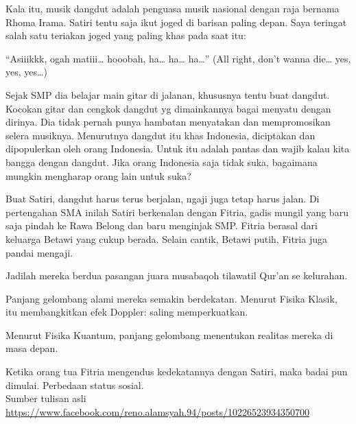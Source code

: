 Kala itu, musik dangdut adalah penguasa musik nasional dengan raja bernama Rhoma Irama. Satiri tentu saja ikut joged di barisan paling depan. Saya teringat salah satu teriakan joged yang paling khas pada saat itu:

“Asiiikkk, ogah matiii… hooobah, ha… ha… ha…” (All right, don’t wanna die… yes, yes, yes…)

Sejak SMP dia belajar main gitar di jalanan, khususnya tentu buat dangdut. Kocokan gitar dan cengkok dangdut yg dimainkannya bagai menyatu dengan dirinya. Dia tidak pernah punya hambatan menyatakan dan mempromosikan selera musiknya. Menurutnya dangdut itu khas Indonesia, diciptakan dan dipopulerkan oleh orang Indonesia. Untuk itu adalah pantas dan wajib kalau kita bangga dengan dangdut. Jika orang Indonesia saja tidak suka, bagaimana mungkin mengharap orang lain untuk suka?

Buat Satiri, dangdut harus terus berjalan, ngaji juga tetap harus jalan. Di pertengahan SMA inilah Satiri berkenalan dengan Fitria, gadis mungil yang baru saja pindah ke Rawa Belong dan baru menginjak SMP. Fitria berasal dari keluarga Betawi yang cukup berada. Selain cantik, Betawi putih, Fitria juga pandai mengaji.

Jadilah mereka berdua pasangan juara musabaqoh tilawatil Qur’an se kelurahan.

Panjang gelombang alami mereka semakin berdekatan. Menurut Fisika Klasik, itu membangkitkan efek Doppler: saling memperkuatkan.

Menurut Fisika Kuantum, panjang gelombang menentukan realitas mereka di masa depan.

Ketika orang tua Fitria mengendus kedekatannya dengan Satiri, maka badai pun dimulai. Perbedaan status sosial.
\\[10pt]


Sumber tulisan asli \url{https://www.facebook.com/reno.alamsyah.94/posts/10226523934350700}

